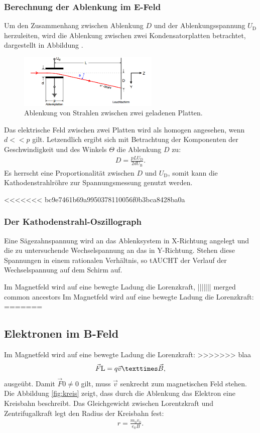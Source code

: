 \subsubsection{Berechnung der Ablenkung im E-Feld}
Um den Zusammenhang zwischen Ablenkung $D$ und der Ablenkungsspannung
$U_\mathrm{D}$ herzuleiten, wird die Ablenkung zwischen zwei
Kondensatorplatten betrachtet, dargestellt in Abbildung \label{fig:platte}.
\begin{figure}
 \centering
 \includegraphics[width=0.6\textwidth]{kondensator.png}
 \caption{Ablenkung von Strahlen zwischen zwei geladenen Platten.}
 \label{fig:kondensator}
\end{figure}
Das elektrische Feld zwischen zwei Platten wird als homogen angesehen, wenn
$d<<p$ gilt.
Letzendlich ergibt sich mit Betrachtung der Komponenten der Geschwindigkeit
und des Winkels $\Theta$ die Ablenkung $D$ zu:
\begin{align}
 D=\frac{pLU_\mathrm{D}}{2dU_\mathrm{B}}.
\end{align}
Es herrscht eine Proportionalität zwischen $D$ und $U_\mathrm{D}$,
somit kann die Kathodenstrahlröhre zur Spannungsmessung genutzt werden.

<<<<<<< bc9e7461b69a9950378110056f0b3bca8428ba0a
\subsubsection{Der Kathodenstrahl-Oszillograph}
Eine Sägezahnspannung wird an das Ablenksystem in X-Richtung angelegt und die zu untersuchende Wechselspannung an das in Y-Richtung.
Stehen diese Spannungen in einem rationalen Verhältnis, so tAUCHT der Verlauf der Wechselspannung auf dem Schirm auf.

Im Magnetfeld wird auf eine bewegte Ladung die Lorenzkraft,
||||||| merged common ancestors
Im Magnetfeld wird auf eine bewegte Ladung die Lorenzkraft:
=======
\subsection{Elektronen im B-Feld}
Im Magnetfeld wird auf eine bewegte Ladung die Lorenzkraft:
>>>>>>> blaa
\begin{align}
\vec{F}\mathrm{L}=q\vec{v}\texttimes\vec{B},
\end{align}
ausgeübt. Damit $\vec{F}\mathrm{0} \neq 0 $ gilt, muss $\vec{v}$ senkrecht zum magnetischen Feld stehen.
Die Abbildung \ref{fig:kreis} zeigt, dass durch die Ablenkung das Elektron eine Kreisbahn beschreibt. Das Gleichgewicht zwischen Lorentzkraft und Zentrifugalkraft legt den
Radius der Kreisbahn fest:
\begin{align}
  r=\frac{m_\mathrm{0}v_\mathrm{0}}{e_\mathrm{0}B}\label{eqn:radius}.
\end{align}

